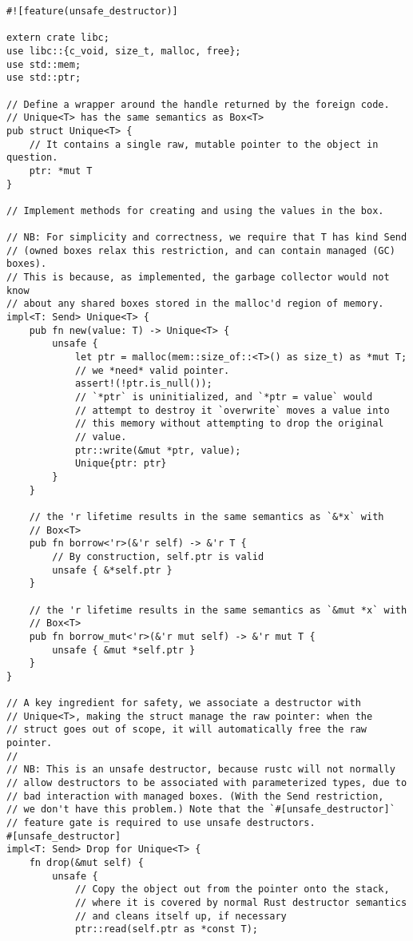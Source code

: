 \documentclass[]{article}
\begin{document}
\begin{verbatim}
#![feature(unsafe_destructor)]

extern crate libc;
use libc::{c_void, size_t, malloc, free};
use std::mem;
use std::ptr;

// Define a wrapper around the handle returned by the foreign code.
// Unique<T> has the same semantics as Box<T>
pub struct Unique<T> {
    // It contains a single raw, mutable pointer to the object in question.
    ptr: *mut T
}

// Implement methods for creating and using the values in the box.

// NB: For simplicity and correctness, we require that T has kind Send
// (owned boxes relax this restriction, and can contain managed (GC) boxes).
// This is because, as implemented, the garbage collector would not know
// about any shared boxes stored in the malloc'd region of memory.
impl<T: Send> Unique<T> {
    pub fn new(value: T) -> Unique<T> {
        unsafe {
            let ptr = malloc(mem::size_of::<T>() as size_t) as *mut T;
            // we *need* valid pointer.
            assert!(!ptr.is_null());
            // `*ptr` is uninitialized, and `*ptr = value` would
            // attempt to destroy it `overwrite` moves a value into
            // this memory without attempting to drop the original
            // value.
            ptr::write(&mut *ptr, value);
            Unique{ptr: ptr}
        }
    }

    // the 'r lifetime results in the same semantics as `&*x` with
    // Box<T>
    pub fn borrow<'r>(&'r self) -> &'r T {
        // By construction, self.ptr is valid
        unsafe { &*self.ptr }
    }

    // the 'r lifetime results in the same semantics as `&mut *x` with
    // Box<T>
    pub fn borrow_mut<'r>(&'r mut self) -> &'r mut T {
        unsafe { &mut *self.ptr }
    }
}

// A key ingredient for safety, we associate a destructor with
// Unique<T>, making the struct manage the raw pointer: when the
// struct goes out of scope, it will automatically free the raw pointer.
//
// NB: This is an unsafe destructor, because rustc will not normally
// allow destructors to be associated with parameterized types, due to
// bad interaction with managed boxes. (With the Send restriction,
// we don't have this problem.) Note that the `#[unsafe_destructor]`
// feature gate is required to use unsafe destructors.
#[unsafe_destructor]
impl<T: Send> Drop for Unique<T> {
    fn drop(&mut self) {
        unsafe {
            // Copy the object out from the pointer onto the stack,
            // where it is covered by normal Rust destructor semantics
            // and cleans itself up, if necessary
            ptr::read(self.ptr as *const T);


\end{verbatim}
\end{document}
